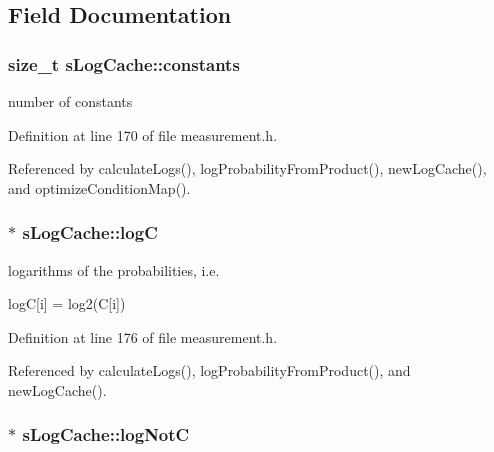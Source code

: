 \subsection{\-Field \-Documentation}
\hypertarget{structsLogCache_a06855ad644ec7343d2952cb079d83cd1}{
\subsubsection[{constants}]{\setlength{\rightskip}{0pt plus 5cm}size\-\_\-t {\bf s\-Log\-Cache\-::constants}}}\label{structsLogCache_a06855ad644ec7343d2952cb079d83cd1}


number of constants 



\-Definition at line 170 of file measurement.\-h.



\-Referenced by calculate\-Logs(), log\-Probability\-From\-Product(), new\-Log\-Cache(), and optimize\-Condition\-Map().

\hypertarget{structsLogCache_ac1a2fe56f678e4b2be3b56f9b6c04163}{
\subsubsection[{log\-C}]{$\ast$ {\bf s\-Log\-Cache\-::log\-C}}}\label{structsLogCache_ac1a2fe56f678e4b2be3b56f9b6c04163}


logarithms of the probabilities, i.\-e. 

log\-C\mbox{[}i\mbox{]} = log2(\-C\mbox{[}i\mbox{]}) 

\-Definition at line 176 of file measurement.\-h.



\-Referenced by calculate\-Logs(), log\-Probability\-From\-Product(), and new\-Log\-Cache().

\hypertarget{structsLogCache_aa9bfdee3aa5ff16f6ef8e3bef6da8f9c}{
\subsubsection[{log\-Not\-C}]{$\ast$ {\bf s\-Log\-Cache\-::log\-Not\-C}}}\label{structsLogCache_aa9bfdee3aa5ff16f6ef8e3bef6da8f9c}


